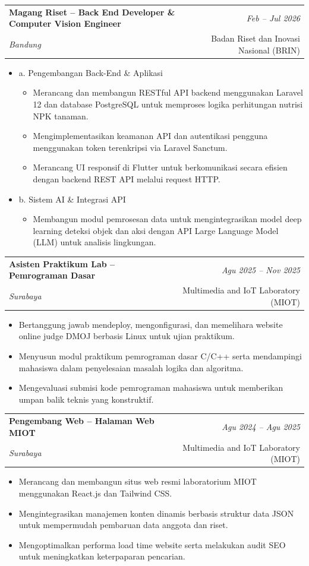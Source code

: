 \documentclass[a4paper,11pt]{article}
\makeatletter
\newcommand{\resumeSubheading}[4]{
\vspace{0.5mm}\item
    \begin{tabular*}{0.98\textwidth}[t]{l@{\extracolsep{\fill}}r}
        \textbf{#1} & \textit{\footnotesize{#4}} \\
        \textit{\footnotesize{#3}} &  \footnotesize{#2}\\
    \end{tabular*}
    \vspace{-2.4mm}
}
\newcommand{\resumeItemListStart}{\begin{justify}\begin{itemize}[leftmargin=3ex, rightmargin=2ex, noitemsep,labelsep=1.2mm,itemsep=0mm]\small}
\newcommand{\resumeItemListEnd}{\end{itemize}\end{justify}\vspace{-2mm}}
\makeatother
\begin{document}
\resumeSubheading
{Magang Riset -- Back End Developer \& Computer Vision Engineer}{Badan Riset dan Inovasi Nasional (BRIN)}
{Bandung}{Feb -- Jul 2026}
\vspace{0mm}
\begin{itemize}[leftmargin=1.5ex, label={}]
\item{a. Pengembangan Back-End \& Aplikasi}
    \begin{itemize}[label=-]
        \item {Merancang dan membangun RESTful API backend menggunakan Laravel 12 dan database PostgreSQL untuk memproses logika perhitungan nutrisi NPK tanaman.}
        \item {Mengimplementasikan keamanan API dan autentikasi pengguna menggunakan token terenkripsi via Laravel Sanctum.}
        \item {Merancang UI responsif di Flutter untuk berkomunikasi secara efisien dengan backend REST API melalui request HTTP.}
    \end{itemize}
\item{b. Sistem AI \& Integrasi API}
    \begin{itemize}[label=-]
        \item {Membangun modul pemrosesan data untuk mengintegrasikan model deep learning deteksi objek dan aksi dengan API Large Language Model (LLM) untuk analisis lingkungan.}
    \end{itemize}
\end{itemize}

\vspace{-2mm}
\resumeSubheading
{Asisten Praktikum Lab -- Pemrograman Dasar}{Multimedia and IoT Laboratory (MIOT)}
{Surabaya}{Agu 2025 -- Nov 2025}
\resumeItemListStart
\item {Bertanggung jawab mendeploy, mengonfigurasi, dan memelihara website online judge DMOJ berbasis Linux untuk ujian praktikum.}
\item {Menyusun modul praktikum pemrograman dasar C/C++ serta mendampingi mahasiswa dalam penyelesaian masalah logika dan algoritma.}
\item {Mengevaluasi submisi kode pemrograman mahasiswa untuk memberikan umpan balik teknis yang konstruktif.}
\resumeItemListEnd

\vspace{-2mm}
\resumeSubheading
{Pengembang Web -- Halaman Web MIOT}{Multimedia and IoT Laboratory (MIOT)}
{Surabaya}{Agu 2024 -- Agu 2025}
\resumeItemListStart
\item {Merancang dan membangun situs web resmi laboratorium MIOT menggunakan React.js dan Tailwind CSS.}
\item {Mengintegrasikan manajemen konten dinamis berbasis struktur data JSON untuk mempermudah pembaruan data anggota dan riset.}
\item {Mengoptimalkan performa load time website serta melakukan audit SEO untuk meningkatkan keterpaparan pencarian.}
\resumeItemListEnd
\end{document}
